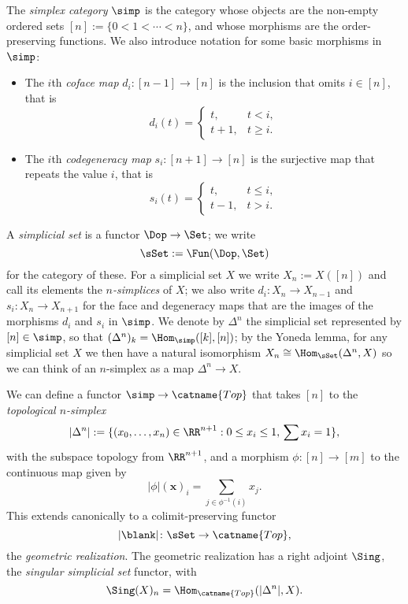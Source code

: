 \documentclass[a4paper,12pt]{article}
\renewcommand{\Top}{\catname{Top}}
\begin{document}
\begin{defn}
  The \emph{simplex category} $\simp$ is the category whose objects
  are the non-empty ordered sets $[n] := \{0 < 1 < \cdots < n\}$, and
  whose morphisms are the order-preserving functions. We also
  introduce notation for some basic morphisms in $\simp$:
  \begin{itemize}
  \item The $i$th \emph{coface map} $d_{i} \colon [n-1] \to [n]$ is the
    inclusion that omits $i \in [n]$, that is
    \[ d_{i}(t) =
      \begin{cases}
        t, & t < i,\\
        t+1, & t \geq i.
      \end{cases}
    \]
  \item The $i$th \emph{codegeneracy map} $s_{i} \colon [n+1] \to [n]$
    is the surjective map that repeats the value $i$, that is
    \[ s_{i}(t) =
      \begin{cases}
        t, & t \leq i,\\
        t-1, & t > i.
      \end{cases}
    \]
  \end{itemize}
\end{defn}

\begin{defn}
  A \emph{simplicial set} is a functor $\Dop \to \Set$; we write
  \[ \sSet := \Fun(\Dop, \Set)\] for the category of these. For a
  simplicial set $X$ we write $X_{n} := X([n])$ and call its elements
  the \emph{$n$-simplices} of $X$; we also write $d_{i} \colon X_{n}
  \to X_{n-1}$ and $s_{i} \colon X_{n} \to X_{n+1}$ for the face and
  degeneracy maps that are the images of the morphisms $d_{i}$ and
  $s_{i}$ in $\simp$. We denote by $\Delta^{n}$ the
  simplicial set represented by $[n] \in \simp$, so that
  $(\Delta^{n})_{k} = \Hom_{\simp}([k], [n])$; by the Yoneda lemma,
  for any simplicial set $X$ we then have a natural isomorphism $X_{n} \cong
  \Hom_{\sSet}(\Delta^{n}, X)$ so we can think of an $n$-simplex as a
  map $\Delta^{n} \to X$.
\end{defn}

\begin{defn}
  We can define a functor $\simp \to \Top$ that takes $[n]$ to the
  \emph{topological $n$-simplex}
  \[ |\Delta^{n}| := \{(x_{0},\ldots,x_{n}) \in \RR^{n+1} : 0 \leq x_{i}
    \leq 1, \, \sum x_{i} = 1\},\]
  with the subspace topology from $\RR^{n+1}$,
  and a morphism $\phi \colon [n] \to [m]$ to the continuous map given
  by
  \[ |\phi|(\mathbf{x})_{i} = \sum_{j \in \phi^{-1}(i)} x_{j}.\]
  This extends canonically to a colimit-preserving functor
  \[ |\blank| \colon \sSet \to \Top, \] the \emph{geometric
    realization}. The geometric realization has a right adjoint
  $\Sing$, the \emph{singular simplicial set} functor, with
  \[ \Sing(X)_{n} = \Hom_{\Top}(|\Delta^{n}|, X).\]
\end{defn}
\end{document}
